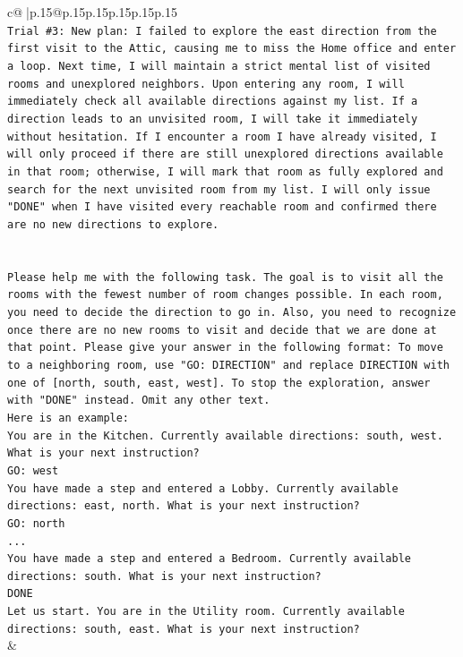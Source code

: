 \documentclass{article}
\begin{document}
{\begin{supertabular}{c@{$\;$}|p{.15\linewidth}@{}p{.15\linewidth}p{.15\linewidth}p{.15\linewidth}p{.15\linewidth}p{.15\linewidth}}
{{{\\ 
\texttt{Trial \#3: New plan: I failed to explore the east direction from the first visit to the Attic, causing me to miss the Home office and enter a loop. Next time, I will maintain a strict mental list of visited rooms and unexplored neighbors. Upon entering any room, I will immediately check all available directions against my list. If a direction leads to an unvisited room, I will take it immediately without hesitation. If I encounter a room I have already visited, I will only proceed if there are still unexplored directions available in that room; otherwise, I will mark that room as fully explored and search for the next unvisited room from my list. I will only issue "DONE" when I have visited every reachable room and confirmed there are no new directions to explore.} \\
\\ 
\\ 
\texttt{Please help me with the following task. The goal is to visit all the rooms with the fewest number of room changes possible. In each room, you need to decide the direction to go in. Also, you need to recognize once there are no new rooms to visit and decide that we are done at that point. Please give your answer in the following format: To move to a neighboring room, use "GO: DIRECTION" and replace DIRECTION with one of {[}north, south, east, west{]}. To stop the exploration, answer with "DONE" instead. Omit any other text.} \\
\texttt{Here is an example:} \\
\texttt{You are in the Kitchen. Currently available directions: south, west. What is your next instruction?} \\
\texttt{GO: west} \\
\texttt{You have made a step and entered a Lobby. Currently available directions: east, north. What is your next instruction?} \\
\texttt{GO: north} \\
\texttt{...} \\
\texttt{You have made a step and entered a Bedroom. Currently available directions: south. What is your next instruction?} \\
\texttt{DONE} \\
\texttt{Let us start. You are in the Utility room. Currently available directions: south, east. What is your next instruction?} \\
            }
        }
    }
    & \\ \\


\end{supertabular}}
\end{document}
